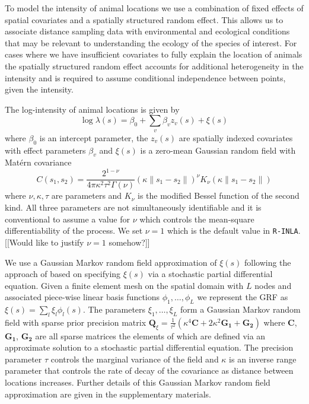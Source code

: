 \documentclass[preprint,12pt]{elsarticle}
\newcommand{\bm}{\boldsymbol}  %
\begin{document}
To model the intensity of animal locations we use a combination of fixed effects of spatial covariates and a spatially structured random effect.  This allows us to associate distance sampling data with environmental and ecological conditions that may be relevant to understanding the ecology of the species of interest.  For cases where we have insufficient covariates to fully explain the location of animals the spatially structured random effect accounts for additional heterogeneity in the intensity and is required to assume conditional independence between points, given the intensity.

The log-intensity of animal locations is given by
\begin{equation*}
\log \lambda(s) = \beta_0 + \sum_v \beta_v z_v(s) + \xi(s)
\end{equation*}
where $\beta_0$ is an intercept parameter, the $z_v(s)$ are spatially indexed covariates with effect parameters $\beta_v$ and $\xi(s)$ is a zero-mean Gaussian random field with Mat\'ern covariance
\begin{equation}
C(s_1,s_2) = \frac{2^{1-\nu}}{4\pi\kappa^2\tau^2\Gamma(\nu)}(\kappa \|s_1-s_2\|)^{\nu}K_\nu(\kappa \|s_1-s_2\|)
\end{equation}
where \(\nu, \kappa, \tau\) are parameters and \(K_{\nu}\) is the modified Bessel function of the second kind.  All three parameters are not simultaneously identifiable \citep{zhang_inconsistent_2004} and it is conventional to assume a value for $\nu$ which controls the mean-square differentiability of the process.  We set $\nu = 1$ which is the default value in \texttt{R-INLA}. [[Would like to justify $\nu = 1$ somehow?]]

We use a Gaussian Markov random field approximation of $\xi(s)$ following the approach of \cite{lindgren_explicit_2011} based on specifying $\xi(s)$ via a stochastic partial differential equation.  Given a finite element mesh on the spatial domain with $L$ nodes and associated piece-wise linear basis functions $\phi_1, \ldots, \phi_L$ we represent the GRF as $\xi(s) = \sum_l \xi_l \phi_l(s)$.  The parameters $\xi_1, \ldots, \xi_L$ form a Gaussian Markov random field with sparse prior precision matrix $\bm{Q}_{\xi} = \frac{1}{\tau^2}\left(\kappa^4\bm{C} + 2\kappa^2\bm{G_1} + \bm{G_2}\right)$ where $\bm{C}$, $\bm{G_1}$, $\bm{G_2}$ are all sparse matrices the elements of which are defined via an approximate solution to a stochastic partial differential equation. The precision parameter $\tau$ controls the marginal variance of the field and $\kappa$ is an inverse range parameter that controls the rate of decay of the covariance as distance between locations increases.  Further details of this Gaussian Markov random field approximation are given in the supplementary materials.
\end{document}
